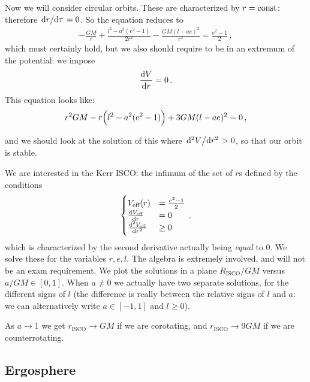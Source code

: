 \documentclass[main.tex]{subfiles}
\begin{document}
Now we will consider circular orbits. These are characterized by \(r = \text{const}\): therefore \(\dv*{r}{\tau }=0\). So the equation reduces to 
%
\begin{align}
    -\frac{GM}{r} + \frac{l^2 - a^2 (e^2-1)}{2r^2} - \frac{GM(l - ae)^2}{r^3} = \frac{e^2-1}{2}
\,,
\end{align}
%
which must certainly hold, but we also should require to be in an extremum of the potential: we impose 
%
\begin{align}
  \dv{V}{r} = 0
\,.
\end{align}
%
This equation looks like: 
%
\begin{align}
  r^2 GM - r \qty(l^2 - a^2(e^2-1)) + 3GM (l-ae)^2=0
\,,
\end{align}
%

and we should look at the solution of this where \(\dv*[2]{V}{r}>0\), so that our orbit is stable. 

We are interested in the Kerr ISCO: the infimum of the set of \(r\)s defined by the conditions 
%
\begin{align}
  \begin{cases}
      V _{\text{eff}} (r) &= \frac{e^2-1}{2}  \\
      \dv{V _{\text{eff}}}{r} (r)&= 0  \\
      \dv[2]{V _{\text{eff}}}{r} (r) &\geq 0
  \end{cases}
\,,
\end{align}
%
which is characterized by the second derivative actually being \emph{equal} to 0. We solve these for the variables \(r, e, l\).
The algebra is extremely involved, and will not be an exam requirement. We plot the solutions in a plane \(R _{\text{ISCO}} / GM\) versus \(a/GM \in [0,1]\). When \(a \neq 0\) we actually have two separate solutions, for the different signs of \(l\) (the difference is really between the relative signs of \(l\) and \(a\): we can alternatively write \(a \in [-1, 1]\) and \(l \geq 0\)). 

As \( a \rightarrow 1\) we get \(r _{\text{ISCO}} \rightarrow GM\) if we are corotating, and \(r _{\text{ISCO}} \rightarrow 9GM\) if we are counterrotating. 

\subsection{Ergosphere}
\end{document}

